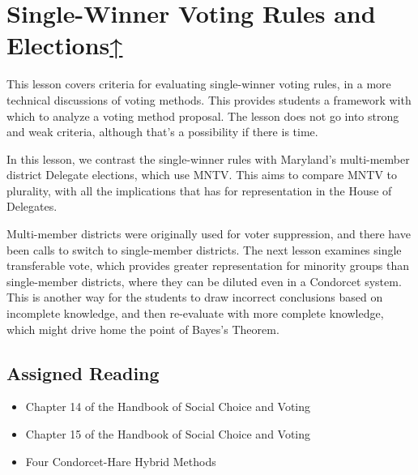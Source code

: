 \label{cur:single-winner-voting-rules}
\section{Single-Winner Voting Rules and Elections\hyperref[syllabus]{↑}}

This lesson covers criteria for evaluating single-winner voting rules, in a more technical discussions of voting methods.  This provides students a framework with which to analyze a voting method proposal.  The lesson does not go into strong and weak criteria, although that's a possibility if there is time.

In this lesson, we contrast the single-winner rules with Maryland's multi-member district Delegate elections, which use MNTV.  This aims to compare MNTV to plurality, with all the implications that has for representation in the House of Delegates.

\begin{boxcomment}
    Multi-member districts were originally used for voter suppression, and there have been calls to switch to single-member districts.  The next lesson examines single transferable vote, which provides greater representation for minority groups than single-member districts, where they can be diluted even in a Condorcet system.  This is another way for the students to draw incorrect conclusions based on incomplete knowledge, and then re-evaluate with more complete knowledge, which might drive home the point of Bayes's Theorem.
\end{boxcomment}

\subsection{Assigned Reading}

\begin{itemize}
    \item Chapter 14 of the Handbook of Social Choice and Voting \autocite[237-260]{Heckelman2015}

    \item Chapter 15 of the Handbook of Social Choice and Voting \autocite[263-281]{Heckelman2015}

    \item Four Condorcet-Hare Hybrid Methods \autocite{GreenArmytage2011}
\end{itemize}

